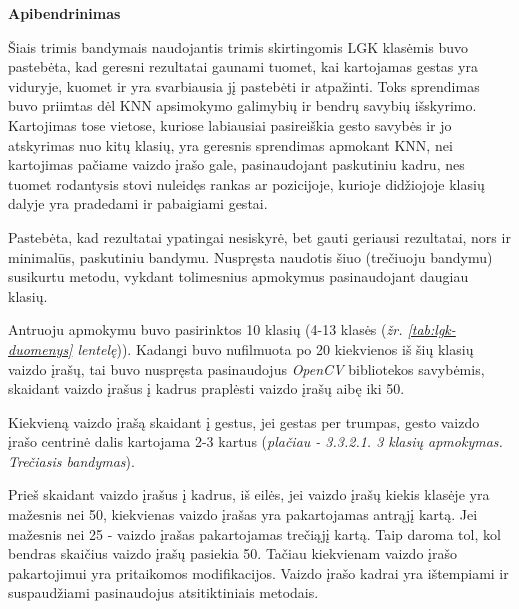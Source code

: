 \documentclass{VUMIFPSbakalaurinis}
\begin{document}
\bigbreak
\textbf{Apibendrinimas}

Šiais trimis bandymais naudojantis trimis skirtingomis LGK klasėmis buvo pastebėta, kad geresni rezultatai gaunami tuomet, kai kartojamas gestas yra viduryje, kuomet ir yra svarbiausia jį pastebėti ir atpažinti. Toks sprendimas buvo priimtas dėl KNN apsimokymo galimybių ir bendrų savybių išskyrimo. Kartojimas tose vietose, kuriose labiausiai pasireiškia gesto savybės ir jo atskyrimas nuo kitų klasių, yra geresnis sprendimas apmokant KNN, nei kartojimas pačiame vaizdo įrašo gale, pasinaudojant paskutiniu kadru, nes tuomet rodantysis stovi nuleidęs rankas ar pozicijoje, kurioje didžiojoje klasių dalyje yra pradedami ir pabaigiami gestai.

Pastebėta, kad rezultatai ypatingai nesiskyrė, bet gauti geriausi rezultatai, nors ir minimalūs, paskutiniu bandymu. Nuspręsta naudotis šiuo (trečiuoju bandymu) susikurtu metodu, vykdant tolimesnius apmokymus pasinaudojant daugiau klasių.


Antruoju apmokymu buvo pasirinktos 10 klasių (4-13 klasės (\textit{žr. \ref{tab:lgk-duomenys} lentelę})). Kadangi buvo nufilmuota po 20 kiekvienos iš šių klasių vaizdo įrašų, tai buvo nuspręsta pasinaudojus \textit{OpenCV} bibliotekos savybėmis, skaidant vaizdo įrašus į kadrus praplėsti vaizdo įrašų aibę iki 50. 

Kiekvieną vaizdo įrašą skaidant į gestus, jei gestas per trumpas, gesto vaizdo įrašo centrinė dalis kartojama 2-3 kartus (\textit{plačiau - 3.3.2.1. 3 klasių apmokymas. Trečiasis bandymas}). 

Prieš skaidant vaizdo įrašus į kadrus, iš eilės, jei vaizdo įrašų kiekis klasėje yra mažesnis nei 50, kiekvienas vaizdo įrašas yra pakartojamas antrąjį kartą. Jei mažesnis nei 25 - vaizdo įrašas pakartojamas trečiąjį kartą. Taip daroma tol, kol bendras skaičius vaizdo įrašų pasiekia 50. Tačiau kiekvienam vaizdo įrašo pakartojimui yra pritaikomos modifikacijos. Vaizdo įrašo kadrai yra ištempiami ir suspaudžiami pasinaudojus atsitiktiniais metodais.
\end{document}
